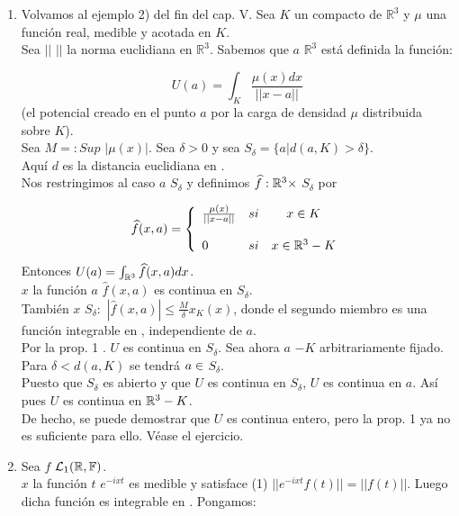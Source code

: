 \begin{enumerate}[1)]
\item Volvamos al ejemplo 2) del fin del cap. V. Sea $K$ un compacto de $\mathbb{R}^3$  y $\mu$ una función real, medible y acotada en $K$. \\
 Sea $||$ $||$ la norma euclidiana en  $\mathbb{R}^3$. Sabemos que \todo  \phantom{}$a$ \en  $\mathbb{R}^3$ está definida la función: 
 
$$ U(a)=\int_K \frac{\mu (x)dx}{|| x-a ||}$$ (el potencial creado en el punto $a$ por la carga de densidad $\mu$ distribuida sobre $K$).\\
Sea $M=:Sup$ $| \mu (x)|$. Sea $\delta>0$ y sea $S_\delta=\lbrace a|d(a,K)>\delta \rbrace$.\\
Aquí $d$ es la distancia euclidiana en  \Rtres . \\
Nos restringimos al caso $a$ \en $S_\delta$ y definimos $\widehat{f}:\mathbb{R}^3 \times$ $S_\delta$ \flecha \R \phantom{} por

\begin{equation*}
\widehat{f}(x,a)= \left\{ \begin{array}{lcc}
             \frac{\mu (x)}{||x-a||} &   si  & x \in K \\
             \\ 0 &  si &  x \in  \mathbb{R}^3 - K \\
             \end{array}
   \right.
\end{equation*}
Entonces $U(a)=\int_{\mathbb{R}^3} \widehat{f}(x,a)dx$.\\
\todo $x$ \en  \Rtres la función $a$ \flecha $\widehat{f}(x,a)$ es continua en $S_\delta$. \\
También \todo $x$ \en $S_\delta :$ $|\widehat{f}(x,a)|\leq \frac{M}{\delta}x_K (x)$, donde el segundo miembro es una función integrable en \Rtres, independiente de $a$. \\
Por la prop. 1 . $U$ es continua en $S_\delta$. Sea ahora $a$ \en \Rtres $-K$ arbitrariamente fijado. Para $\delta<d(a,K)$ se tendrá $a \in$ $S_\delta$.\\
Puesto que $S_\delta$ es abierto y que $U$ es continua en $S_\delta$, $U$ es continua en $a$. Así pues $U$ es continua en $\mathbb{R}^3 - K$. \\
De hecho, se puede demostrar que $U$ es continua \Rtres \phantom{} entero, pero la prop. 1 ya no es suficiente para ello. Véase el ejercicio.

\item Sea $f$ \en  $\mathcal{L}_1(\mathbb{R},\mathbb{F})$. \\
\todo  \phantom{} $x$ \en \R \phantom{} la función $t$ \flecha $e^{-ixt}$ es medible y satisface (1) $||e^{-ixt} f(t)||=||f(t)||$. Luego dicha función es integrable en \R. Pongamos:


\end{enumerate}
